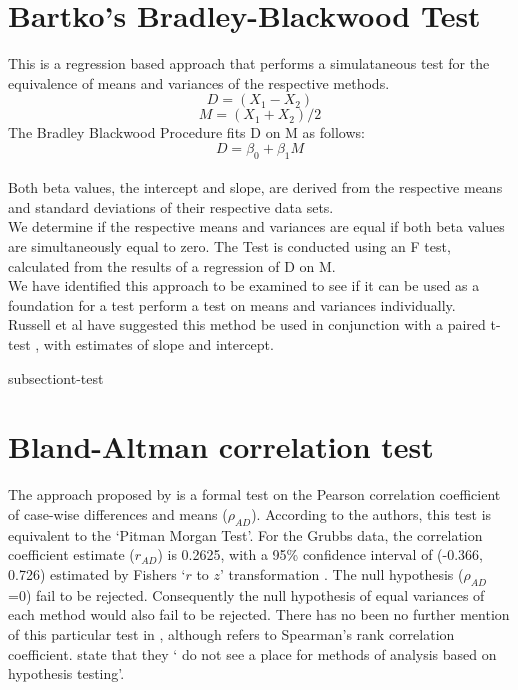 \documentclass[12pt, a4paper]{report}
\theoremstyle{plain}
\theoremstyle{definition}
\theoremstyle{remark}
\begin{document}
	

	\section{Bartko's Bradley-Blackwood Test}
	This is a regression based approach that performs a simulataneous
	test for the equivalence of means and variances of the respective
	methods.\\
	\begin{equation}
	D = (X_{1}-X_{2})
	\end{equation}
	\begin{equation}
	M = (X_{1} + X_{2}) /2
	\end{equation}
	The Bradley Blackwood Procedure fits D on M as follows:\\
	\begin{equation}
	D = \beta_{0} + \beta_{1}M
	\end{equation}
	\\Both beta values, the intercept and slope, are derived from the respective means and
	standard deviations of their respective data sets.\\
	We determine if the respective means and variances are equal if
	both beta values are simultaneously equal to zero. The Test is
	conducted using an F test, calculated from the results of a
	regression of D on M.
	\\We have identified this approach  to be examined to see if it can
	be used as a foundation for a test perform a test on means and
	variances individually.\\
	Russell et al have suggested this method be used in conjunction
	with a paired t-test , with estimates of slope and intercept.
	
	subsection{t-test}
	\section{Bland-Altman correlation test}
	
	The approach proposed by \citet{BA83} is a formal test on the
	Pearson correlation coefficient of case-wise differences and means ($\rho_{AD}$). According to the authors, this test is equivalent
	to the `Pitman Morgan Test'. For the Grubbs data, the correlation coefficient estimate ($r_{AD}$) is 0.2625, with a 95\% confidence
	interval of (-0.366, 0.726) estimated by Fishers `$r$ to $z$' transformation \citep*{Cohen}. The null hypothesis ($\rho_{AD}$ =0)
	fail to be rejected. Consequently the null hypothesis of equal variances of each method would also fail to be rejected. There has
	no been no further mention of this particular test in \citet{BA86}, although \citet{BA99} refers to Spearman's rank
	correlation coefficient. \citet{BA99} state that they ` do not see a place for methods of analysis based on hypothesis testing'.
	
\end{document}
